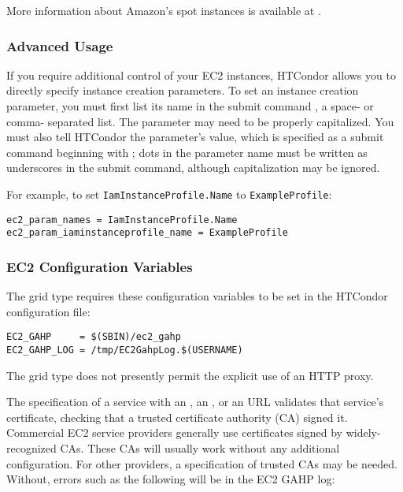 More information about Amazon's spot instances is available at
.

\subsubsection{\label{sec:Amazon-parameters}Advanced Usage}

If you require additional control of your EC2 instances, HTCondor allows
you to directly specify instance creation parameters.  To set an instance
creation parameter, you must first list its name in the submit command
, a space- or comma- separated list.  The
parameter may need to be properly capitalized.  You must also tell HTCondor
the parameter's value, which is specified as a submit command beginning with
; dots in the parameter name must be
written as underscores in the submit command, although capitalization may
be ignored.

For example, to set \texttt{IamInstanceProfile.Name} to \texttt{ExampleProfile}:

\begin{verbatim}
ec2_param_names = IamInstanceProfile.Name
ec2_param_iaminstanceprofile_name = ExampleProfile
\end{verbatim}

\subsubsection{\label{sec:Amazon-config}EC2 Configuration Variables}

The  grid type requires these configuration variables 
to be set in the HTCondor configuration file:

\footnotesize
\begin{verbatim}
EC2_GAHP     = $(SBIN)/ec2_gahp
EC2_GAHP_LOG = /tmp/EC2GahpLog.$(USERNAME)
\end{verbatim}
\normalsize

The  grid type does not presently permit the explicit use 
of an HTTP proxy.

The specification of a service with an , an ,
or an  URL validates that service's certificate,
checking that a trusted certificate authority (CA) signed it.
Commercial EC2 service providers generally use certificates signed by 
widely-recognized CAs.
These CAs will usually work without any additional configuration.  
For other providers, a specification of trusted CAs may be needed.
Without, errors such as the following will be in the EC2 GAHP log:

